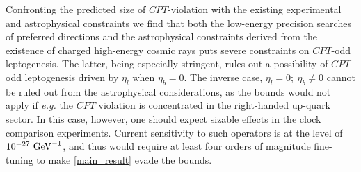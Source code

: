 \documentclass[12pt]{revtex4}
\newcommand{\GeV}{{\rm GeV}}
\begin{document}
	Confronting the predicted size of $CPT$-violation with the existing experimental 
	and astrophysical constraints we find that both the low-energy precision searches of preferred 
	directions and the astrophysical constraints derived from the 
existence of charged high-energy cosmic rays puts severe 
	constraints on $CPT$-odd leptogenesis. The latter, being 
especially stringent, rules out a possibility of $CPT$-odd leptogenesis
driven by $\eta_l$ when $\eta_b =0 $. The inverse case, $\eta_l=0;~\eta_b \neq0 $
cannot be ruled out from the astrophysical considerations, as the bounds would not apply
if {\em e.g.} the $CPT$ violation is concentrated in the right-handed up-quark sector. 
In this case, however, one should expect  sizable effects in the clock comparison 
experiments. Current sensitivity to such operators is at the level of $10^{-27}~\GeV^{-1}$, 
and thus would require at least four orders of magnitude fine-tuning to make \eqref{main_result} 
evade the bounds. 
\end{document}
